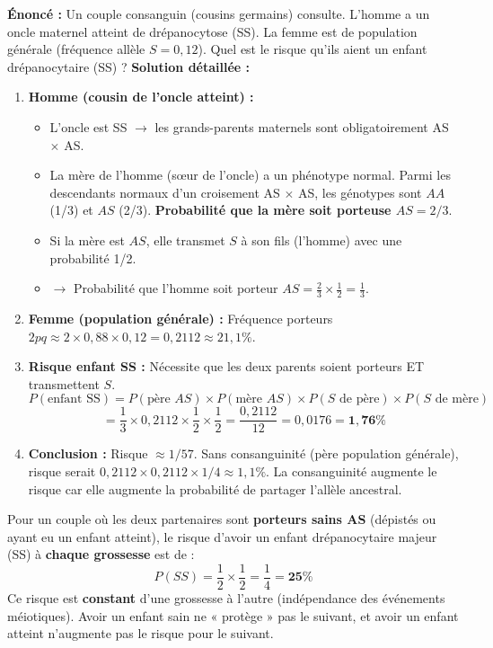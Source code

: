 \documentclass[11pt]{article}
\begin{document}
\begin{exoresolu}
\textbf{Énoncé :} Un couple consanguin (cousins germains) consulte. L'homme a un oncle maternel atteint de drépanocytose (SS). La femme est de population générale (fréquence allèle $S = 0,12$). Quel est le risque qu'ils aient un enfant drépanocytaire (SS) ?
\textbf{Solution détaillée :}
\begin{enumerate}
    \item \textbf{Homme (cousin de l'oncle atteint) :}
    \begin{itemize}
        \item L'oncle est SS $\to$ les grands-parents maternels sont obligatoirement AS $\times$ AS.
        \item La mère de l'homme (sœur de l'oncle) a un phénotype normal. Parmi les descendants normaux d'un croisement AS $\times$ AS, les génotypes sont $AA$ (1/3) et $AS$ (2/3). \textbf{Probabilité que la mère soit porteuse $AS = 2/3$}.
        \item Si la mère est $AS$, elle transmet $S$ à son fils (l'homme) avec une probabilité 1/2.
        \item $\to$ Probabilité que l'homme soit porteur $AS = \frac{2}{3} \times \frac{1}{2} = \frac{1}{3}$.
    \end{itemize}
    \item \textbf{Femme (population générale) :} Fréquence porteurs $2pq \approx 2 \times 0,88 \times 0,12 = 0,2112 \approx 21,1 \%$.
    \item \textbf{Risque enfant SS :} Nécessite que les deux parents soient porteurs ET transmettent $S$.
    \[
    P(\text{enfant SS}) = P(\text{père } AS) \times P(\text{mère } AS) \times P(S \text{ de père}) \times P(S \text{ de mère})
    \]
    \[
    = \frac{1}{3} \times 0,2112 \times \frac{1}{2} \times \frac{1}{2} = \frac{0,2112}{12} = 0,0176 = \mathbf{1,76 \%}
    \]
    \item \textbf{Conclusion :} Risque $\approx 1/57$. Sans consanguinité (père population générale), risque serait $0,2112 \times 0,2112 \times 1/4 \approx 1,1 \%$. La consanguinité augmente le risque car elle augmente la probabilité de partager l'allèle ancestral.
\end{enumerate}
\end{exoresolu}

\begin{exemplebox}
Pour un couple où les deux partenaires sont \textbf{porteurs sains AS} (dépistés ou ayant eu un enfant atteint), le risque d'avoir un enfant drépanocytaire majeur (SS) à \textbf{chaque grossesse} est de :
\[
P(SS) = \frac{1}{2} \times \frac{1}{2} = \frac{1}{4} = \mathbf{25 \%}
\]
Ce risque est \textbf{constant} d'une grossesse à l'autre (indépendance des événements méiotiques). Avoir un enfant sain ne « protège » pas le suivant, et avoir un enfant atteint n'augmente pas le risque pour le suivant.
\end{exemplebox}
\end{document}

